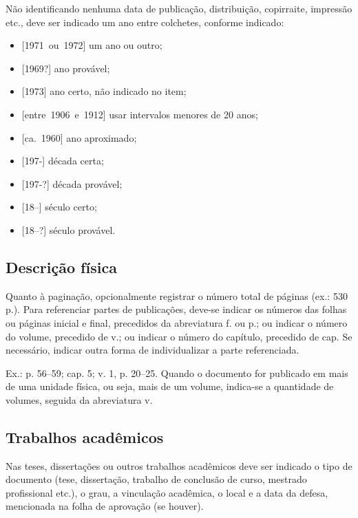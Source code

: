 Não identificando nenhuma data de publicação, distribuição, copirraite, impressão etc., deve ser indicado um ano entre colchetes, conforme indicado:

\begin{itemize}
  \item \mbox{[1971 ou 1972]} um ano ou outro;
  \item \mbox{[1969?]} ano provável;
  \item \mbox{[1973]} ano certo, não indicado no item;
  \item \mbox{[entre 1906 e 1912]} usar intervalos menores de 20 anos;
  \item \mbox{[ca. 1960]} ano aproximado;
  \item \mbox{[197-]} década certa;
  \item \mbox{[197-?]} década provável;
  \item \mbox{[18--]} século certo;
  \item \mbox{[18--?]} século provável.
\end{itemize}

\subsection{Descrição física}

Quanto à paginação, opcionalmente registrar o número total de páginas (ex.: 530 p.). Para referenciar partes de publicações, deve-se indicar os números das folhas ou páginas inicial e final, precedidos da abreviatura f. ou p.; ou indicar o número do volume, precedido de v.; ou indicar o número do capítulo, precedido de cap. Se necessário, indicar outra forma de individualizar a parte referenciada.

Ex.: p. 56--59; cap. 5; v. 1, p. 20--25. Quando o documento for publicado em mais de uma unidade física, ou seja, mais de um volume, indica-se a quantidade de volumes, seguida da abreviatura v.


\subsection{Trabalhos acadêmicos}

Nas teses, dissertações ou outros trabalhos acadêmicos deve ser indicado o tipo de documento (tese, dissertação, trabalho de conclusão de curso, mestrado profissional etc.), o grau, a vinculação acadêmica, o local e a data da defesa, mencionada na folha de aprovação (se houver).

